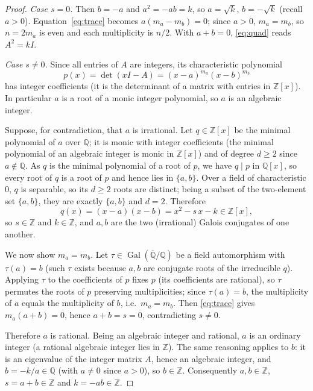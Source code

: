 \documentclass{amsart}
\theoremstyle{definition}
\begin{document}
\begin{proof}
\emph{Case $s=0$.} Then $b=-a$ and $a^2=-ab=k$, so $a=\sqrt k$, $b=-\sqrt k$
(recall $a>0$). Equation~\eqref{eq:trace} becomes $a(m_a-m_b)=0$; since $a>0$,
$m_a=m_b$, so $n=2m_a$ is even and each multiplicity is $n/2$. With $a+b=0$,
\eqref{eq:quad} reads $A^2=kI$.

\emph{Case $s\ne0$.} Since all entries of $A$ are integers, its characteristic
polynomial
\[
p(x)=\det(xI-A)=(x-a)^{m_a}(x-b)^{m_b}
\]
has integer coefficients (it is the determinant of a matrix with entries in
$\mathbb Z[x]$). In particular $a$ is a root of a monic integer polynomial, so
$a$ is an algebraic integer.

Suppose, for contradiction, that $a$ is irrational. Let $q\in\mathbb Z[x]$ be
the minimal polynomial of $a$ over $\mathbb Q$; it is monic with integer
coefficients (the minimal polynomial of an algebraic integer is monic in
$\mathbb Z[x]$) and of degree $d\ge2$ since $a\notin\mathbb Q$. As $q$ is the
minimal polynomial of a root of $p$, we have $q\mid p$ in $\mathbb Q[x]$, so
every root of $q$ is a root of $p$ and hence lies in $\{a,b\}$. Over a field of
characteristic $0$, $q$ is separable, so its $d\ge2$ roots are distinct; being
a subset of the two-element set $\{a,b\}$, they are exactly $\{a,b\}$ and
$d=2$. Therefore
\[
q(x)=(x-a)(x-b)=x^2-s\,x-k\in\mathbb Z[x],
\]
so $s\in\mathbb Z$ and $k\in\mathbb Z$, and $a,b$ are the two (irrational)
Galois conjugates of one another.

We now show $m_a=m_b$. Let $\tau\in\operatorname{Gal}(\overline{\mathbb
Q}/\mathbb Q)$ be a field automorphism with $\tau(a)=b$ (such $\tau$ exists
because $a,b$ are conjugate roots of the irreducible $q$). Applying $\tau$ to
the coefficients of $p$ fixes $p$ (its coefficients are rational), so
$\tau$ permutes the roots of $p$ preserving multiplicities; since
$\tau(a)=b$, the multiplicity of $a$ equals the multiplicity of $b$, i.e.\
$m_a=m_b$. Then \eqref{eq:trace} gives $m_a(a+b)=0$, hence $a+b=s=0$,
contradicting $s\ne0$.

Therefore $a$ is rational. Being an algebraic integer and rational, $a$ is an
ordinary integer (a rational algebraic integer lies in $\mathbb Z$). The same
reasoning applies to $b$: it is an eigenvalue of the integer matrix $A$, hence an
algebraic integer, and $b=-k/a\in\mathbb Q$ (with $a\ne0$ since $a>0$), so
$b\in\mathbb Z$. Consequently $a,b\in\mathbb Z$, $s=a+b\in\mathbb Z$ and
$k=-ab\in\mathbb Z$.
\end{proof}
\end{document}
